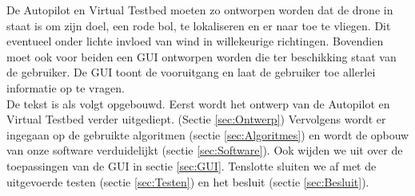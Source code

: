 De Autopilot en Virtual Testbed moeten zo ontworpen worden dat de drone in staat is om zijn doel, een rode bol, te lokaliseren en er naar toe te vliegen. Dit eventueel onder lichte invloed van wind in willekeurige richtingen. Bovendien moet ook voor beiden een GUI ontworpen worden die ter beschikking staat van de gebruiker. De GUI toont de vooruitgang en laat de gebruiker toe allerlei informatie op te vragen. \\

De tekst is als volgt opgebouwd. Eerst wordt het ontwerp van de Autopilot en Virtual Testbed verder uitgediept. (Sectie \ref{sec:Ontwerp}) Vervolgens wordt er ingegaan op de gebruikte algoritmen (sectie \ref{sec:Algoritmes}) en wordt de opbouw van onze software verduidelijkt (sectie \ref{sec:Software}). Ook wijden we uit over de toepassingen van de GUI in sectie \ref{sec:GUI}. Tenslotte sluiten we af met de uitgevoerde testen (sectie \ref{sec:Testen}) en het besluit (sectie \ref{sec:Besluit}). \\
